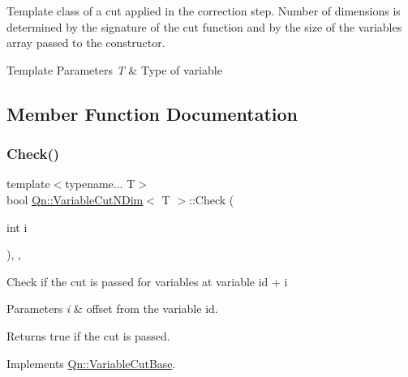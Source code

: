 Template class of a cut applied in the correction step. Number of dimensions is determined by the signature of the cut function and by the size of the variables array passed to the constructor. 
\begin{DoxyTemplParams}{Template Parameters}
{\em T} & Type of variable \\
\hline
\end{DoxyTemplParams}


\subsection{Member Function Documentation}
\mbox{\label{classQn_1_1VariableCutNDim_a572a7d7e846d4b16a4dcacf138056347}} 
\subsubsection{\texorpdfstring{Check()}{Check()}}
{\footnotesize\ttfamily template$<$typename... T$>$ \\
bool \mbox{\hyperlink{classQn_1_1VariableCutNDim}{Qn\+::\+Variable\+Cut\+N\+Dim}}$<$ T $>$\+::Check (\begin{DoxyParamCaption}\item[{int}]{i }\end{DoxyParamCaption})\hspace{0.3cm}{\ttfamily [inline]}, {\ttfamily [override]}, {\ttfamily [virtual]}}

Check if the cut is passed for variables at variable id + i 
\begin{DoxyParams}{Parameters}
{\em i} & offset from the variable id. \\
\hline
\end{DoxyParams}
\begin{DoxyReturn}{Returns}
true if the cut is passed. 
\end{DoxyReturn}


Implements \mbox{\hyperlink{structQn_1_1VariableCutBase}{Qn\+::\+Variable\+Cut\+Base}}.

\mbox{\label{classQn_1_1VariableCutNDim_a623c598922f52c0b459f43981a9d2636}} 
